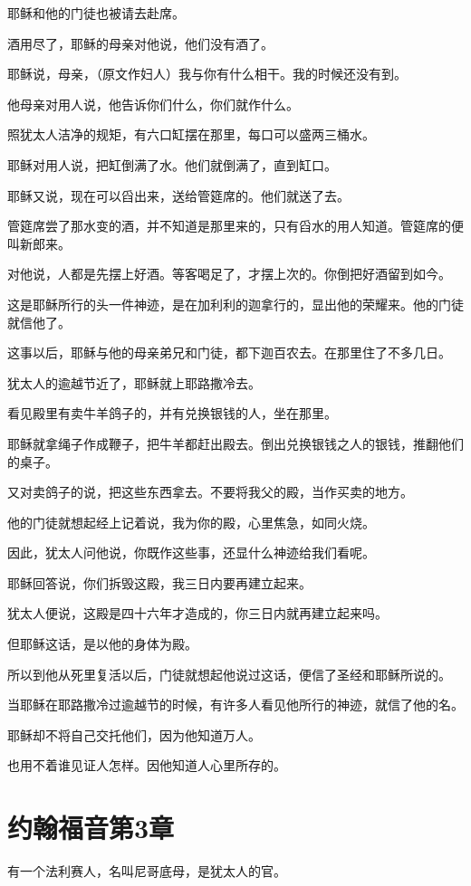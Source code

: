 \documentclass[12pt,oneside]{book}
\begin{document}
耶稣和他的门徒也被请去赴席。

酒用尽了，耶稣的母亲对他说，他们没有酒了。

耶稣说，母亲，（原文作妇人）我与你有什么相干。我的时候还没有到。

他母亲对用人说，他告诉你们什么，你们就作什么。

照犹太人洁净的规矩，有六口缸摆在那里，每口可以盛两三桶水。

耶稣对用人说，把缸倒满了水。他们就倒满了，直到缸口。

耶稣又说，现在可以舀出来，送给管筵席的。他们就送了去。

管筵席尝了那水变的酒，并不知道是那里来的，只有舀水的用人知道。管筵席的便叫新郎来。

对他说，人都是先摆上好酒。等客喝足了，才摆上次的。你倒把好酒留到如今。

这是耶稣所行的头一件神迹，是在加利利的迦拿行的，显出他的荣耀来。他的门徒就信他了。

这事以后，耶稣与他的母亲弟兄和门徒，都下迦百农去。在那里住了不多几日。

犹太人的逾越节近了，耶稣就上耶路撒冷去。

看见殿里有卖牛羊鸽子的，并有兑换银钱的人，坐在那里。

耶稣就拿绳子作成鞭子，把牛羊都赶出殿去。倒出兑换银钱之人的银钱，推翻他们的桌子。

又对卖鸽子的说，把这些东西拿去。不要将我父的殿，当作买卖的地方。

他的门徒就想起经上记着说，我为你的殿，心里焦急，如同火烧。

因此，犹太人问他说，你既作这些事，还显什么神迹给我们看呢。

耶稣回答说，你们拆毁这殿，我三日内要再建立起来。

犹太人便说，这殿是四十六年才造成的，你三日内就再建立起来吗。

但耶稣这话，是以他的身体为殿。

所以到他从死里复活以后，门徒就想起他说过这话，便信了圣经和耶稣所说的。

当耶稣在耶路撒冷过逾越节的时候，有许多人看见他所行的神迹，就信了他的名。

耶稣却不将自己交托他们，因为他知道万人。

也用不着谁见证人怎样。因他知道人心里所存的。

\chapter{约翰福音第3章}
有一个法利赛人，名叫尼哥底母，是犹太人的官。
\end{document}
